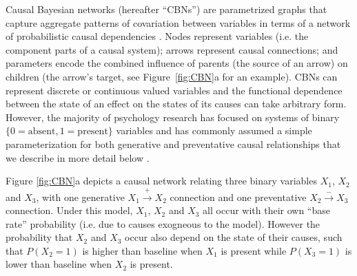 \documentclass{cambridge7A}%
\newcommand{\ntodo}[2][]{\vspace{0.1cm} \hfil \todo[caption={\textbf{NB}}, size=\footnotesize, color = aliceblue, inline, #1]{#2}}
\newcommand{\ttodo}[2][]{\vspace{0.1cm} \hfil \todo[caption={\textbf{TG}}, size=\footnotesize, color = orange, inline, #1]{#2}}
\DeclareMathOperator*{\pa}{ca} %
\newcommand{\ww}{\mathbf{w}} %
\begin{document}
Causal Bayesian networks (hereafter ``CBNs'')  are parametrized graphs that capture aggregate patterns of covariation between variables in terms of  a network of probabilistic causal dependencies \citep{pearl2000causality}. %
Nodes represent variables (i.e. the component parts of a causal system); arrows represent causal connections; and parameters encode the combined influence of parents (the source of an arrow) on children (the arrow's target, see Figure~\ref{fig:CBN}a for an example).  CBNs can represent discrete or continuous valued variables and the functional dependence between the state of an effect on the states of its causes can take arbitrary form.  However, the majority of psychology research has focused on  systems of binary $\{0=\mathrm{absent},1=\mathrm{present}\}$ variables and has commonly assumed a simple parameterization for both generative and preventative causal relationships that we describe in more detail below \citep{cheng1997from}.  %

Figure \ref{fig:CBN}a depicts a causal network relating three binary variables $X_1$, $X_2$ and $X_3$, with one generative $X_1\!\stackrel{+}\rightarrow\!X_2$ connection and one preventative $X_2\!\stackrel{-}\rightarrow\!X_3$ connection.  Under this model, $X_1$, $X_2$ and $X_3$ all occur with their own ``base rate'' probability (i.e. due to causes exogneous to the model).  However the probability that $X_2$ and $X_3$ occur also depend on the state of their causes, such that  $P(X_2=1)$ is higher than baseline when $X_1$ is present while $P(X_3=1)$ is lower than baseline when $X_2$ is present.
\end{document}
